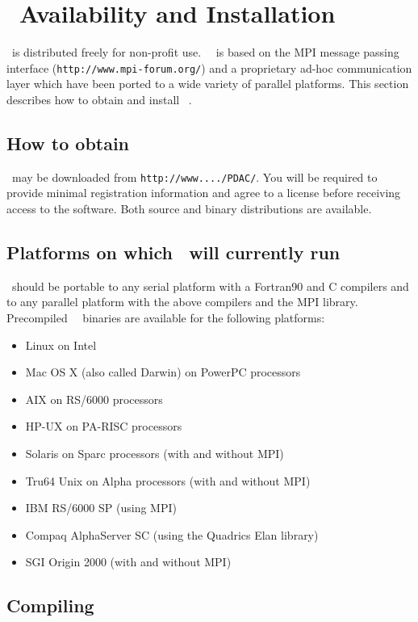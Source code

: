 
\section{\PDAC\ Availability and Installation}
\label{section:avail}

\PDAC\ is distributed freely for non-profit use.
\PDAC\ \PDACVERSION\ is based on the MPI message passing interface
({\tt http://www.mpi-forum.org/})
and a proprietary ad-hoc communication layer
which have been ported to a wide variety of parallel platforms.
This section describes how to obtain and install \PDAC\ \PDACVERSION.

\subsection{How to obtain \PDAC}

\PDAC\ may be downloaded from {\tt http://www..../PDAC/}.
You will be required to provide minimal registration information and
agree to a license before receiving access to the software.
Both source and binary distributions are available.

\subsection{Platforms on which \PDAC\ will currently run}

\PDAC\ should be portable to any serial platform with a
Fortran90 and C compilers and to any parallel platform with
the above compilers and the MPI library.
Precompiled \PDAC\ \PDACVERSION\ binaries are available for the following platforms:  
\begin{itemize}
\item Linux on Intel
\item Mac OS X (also called Darwin) on PowerPC processors
\item AIX on RS/6000 processors 
\item HP-UX on PA-RISC processors 
\item Solaris on Sparc processors (with and without MPI)
\item Tru64 Unix on Alpha processors (with and without MPI)
\item IBM RS/6000 SP (using MPI)
\item Compaq AlphaServer SC (using the Quadrics Elan library)
\item SGI Origin 2000 (with and without MPI) 
\end{itemize}

\subsection{Compiling \PDAC}

